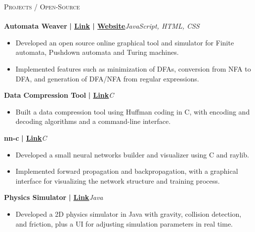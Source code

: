 \documentclass[a4paper]{article}
\newcommand{\lineunder} {
    \vspace*{-8pt} \\
    \hspace*{-18pt} \hrulefill \\
}
\newcommand{\header} [1] {
    {\hspace*{-18pt}\vspace*{6pt} \textsc{#1}}
    \vspace*{-6pt} \lineunder
}
\begin{document}
      \header{Projects / Open-Source}
      \vspace{2mm}
      {\textbf{Automata Weaver}}\textbf{ | \href{https://github.com/syedhuzaif199/automata-weaver}{\underline{Link}} | \href{https://syedhuzaif199.github.io/automata-weaver}{\underline{Website}}}\hfill{\sl JavaScript, HTML, CSS}\\
          \vspace{-1mm}
\begin{itemize} \itemsep -3pt
\item  Developed an open source online graphical tool and simulator for Finite automata, Pushdown automata and Turing machines.
\item  Implemented features such as minimization of DFAs, conversion from NFA to DFA, and generation of DFA/NFA from regular expressions.
\end{itemize}
          \vspace*{3mm}
      {\textbf{Data Compression Tool}}\textbf{ | \href{https://github.com/syedhuzaif199/data-compression-tool}{\underline{Link}}}\hfill{\sl C}\\
          \vspace{-1mm}
\begin{itemize} \itemsep -3pt
\item Built a data compression tool using Huffman coding in C, with encoding and decoding algorithms and a command-line interface.
\end{itemize}
          \vspace*{3mm}
      {\textbf{nn-c}}\textbf{ | \href{https://github.com/syedhuzaif199/nn-c}{\underline{Link}}}\hfill{\sl C}\\
          \vspace{-1mm}
\begin{itemize} \itemsep -3pt
\item Developed a small neural networks builder and visualizer using C and raylib.
\item Implemented forward propagation and backpropagation, with a graphical interface for visualizing the network structure and training process.
\end{itemize}
          \vspace*{3mm}
      {\textbf{Physics Simulator}}\textbf{ | \href{https://github.com/syedhuzaif199/physics-simulator}{\underline{Link}}}\hfill{\sl Java}\\
          \vspace{-1mm}
\begin{itemize} \itemsep -3pt
\item Developed a 2D physics simulator in Java with gravity, collision detection, and friction, plus a UI for adjusting simulation parameters in real time.
\end{itemize}
\end{document}
